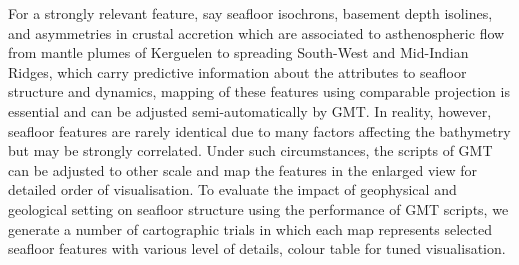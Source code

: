 \documentclass[geomatics,article,submit,pdftex,moreauthors]{Definitions/mdpi}
\begin{document}
For a strongly relevant feature, say seafloor isochrons, basement depth isolines, and asymmetries in crustal accretion which are associated to asthenospheric flow from mantle plumes of Kerguelen  to spreading South-West and Mid-Indian Ridges, which carry predictive information about the attributes to seafloor structure and dynamics, mapping of these features using comparable projection is essential and can be adjusted semi-automatically by GMT. In reality, however, seafloor features are rarely identical due to many factors affecting the bathymetry but may be strongly correlated. Under such circumstances, the scripts of GMT can be adjusted to other scale and map the features in the enlarged view for detailed order of visualisation. To evaluate the impact of geophysical and geological setting on seafloor structure using the performance of GMT scripts, we generate a number of cartographic trials in which each map represents selected seafloor features with various level of details, colour table for tuned visualisation. 








\end{document}
